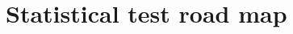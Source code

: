 \section{Statistical test road map}
\label{decisionTree}

\begin{minipage}[!h]{\textwidth}

\end{minipage}

\clearpage %



\clearpage %
